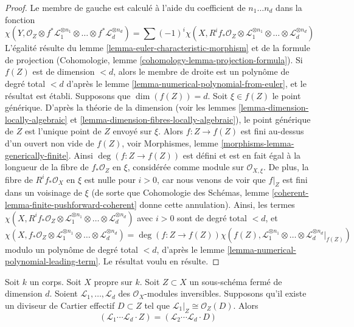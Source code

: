 \begin{proof}
Le membre de gauche est calculé à l'aide du coefficient de $n_1 \ldots n_d$
dans la fonction
$$
\chi(Y, \mathcal{O}_Z \otimes f^*\mathcal{L}_1^{\otimes n_1} \otimes
\ldots \otimes f^*\mathcal{L}_d^{\otimes n_d}) =
\sum (-1)^i
\chi(X, R^if_*\mathcal{O}_Z \otimes
\mathcal{L}_1^{\otimes n_1} \otimes \ldots \otimes
\mathcal{L}_d^{\otimes n_d})
$$
L'égalité résulte du lemme \ref{lemma-euler-characteristic-morphism}
et de la formule de projection
(Cohomologie, lemme \ref{cohomology-lemma-projection-formula}).
Si $f(Z)$ est de dimension $< d$, alors le membre de droite
est un polynôme de degré total $< d$ d'après le
lemme \ref{lemma-numerical-polynomial-from-euler},
et le résultat est établi. Supposons que $\dim(f(Z)) = d$. Soit
$\xi \in f(Z)$ le point générique. D'après la
théorie de la dimension (voir les lemmes \ref{lemma-dimension-locally-algebraic} et
\ref{lemma-dimension-fibres-locally-algebraic}),
le point générique de $Z$ est l'unique point de $Z$ envoyé sur $\xi$.
Alors $f : Z \to f(Z)$ est fini au-dessus d'un ouvert non vide de $f(Z)$, voir
Morphismes, lemme \ref{morphisms-lemma-generically-finite}.
Ainsi $\deg(f : Z \to f(Z))$ est défini et est en fait égal
à la longueur de la fibre de $f_*\mathcal{O}_Z$ en $\xi$, considérée
comme module sur $\mathcal{O}_{X, \xi}$. De plus, la fibre de
$R^if_*\mathcal{O}_X$ en $\xi$ est nulle pour $i > 0$, car
nous venons de voir que $f|_Z$ est fini dans un voisinage de $\xi$
(de sorte que Cohomologie des Schémas, lemme
\ref{coherent-lemma-finite-pushforward-coherent} donne cette annulation).
Ainsi, les termes $\chi(X, R^if_*\mathcal{O}_Z \otimes
\mathcal{L}_1^{\otimes n_1} \otimes \ldots \otimes
\mathcal{L}_d^{\otimes n_d})$ avec $i > 0$ sont de degré total
$< d$, et
$$
\chi(X, f_*\mathcal{O}_Z \otimes
\mathcal{L}_1^{\otimes n_1} \otimes \ldots \otimes
\mathcal{L}_d^{\otimes n_d})
=
\deg(f : Z \to f(Z)) \chi(f(Z),
\mathcal{L}_1^{\otimes n_1} \otimes \ldots \otimes
\mathcal{L}_d^{\otimes n_d}|_{f(Z)})
$$
modulo un polynôme de degré total $< d$, d'après le
lemme \ref{lemma-numerical-polynomial-leading-term}.
Le résultat voulu en résulte.
\end{proof}

\begin{lemma}
\label{lemma-numerical-intersection-effective-Cartier-divisor}
Soit $k$ un corps. Soit $X$ propre sur $k$. Soit $Z \subset X$ un
sous-schéma fermé de dimension $d$. Soient $\mathcal{L}_1, \ldots, \mathcal{L}_d$
des $\mathcal{O}_X$-modules inversibles. Supposons qu'il existe un
diviseur de Cartier effectif $D \subset Z$ tel que
$\mathcal{L}_1|_Z \cong \mathcal{O}_Z(D)$. Alors
$$
(\mathcal{L}_1 \cdots \mathcal{L}_d \cdot Z) =
(\mathcal{L}_2 \cdots \mathcal{L}_d \cdot D)
$$
\end{lemma}


